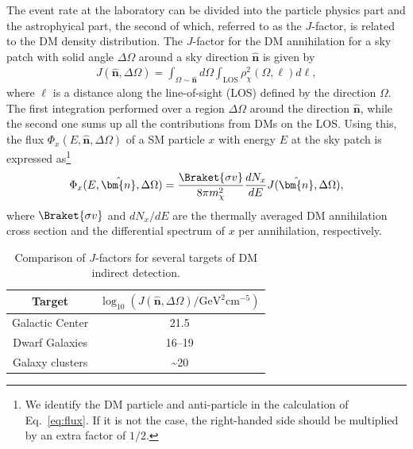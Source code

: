 \documentclass[12pt,twoside,book]{article}
\begin{document}
The event rate at the laboratory can be divided into the particle physics part and the astrophyical part, the second of which, referred to as the $J$-factor, is related to the DM density distribution.
The $J$-factor for the DM annihilation for a sky patch with solid angle $\Delta\Omega$ around a sky direction $\hat{\bm{n}}$ is given by
\begin{align}
  J(\hat{\bm{n}}, \Delta\Omega) = \int_{\Omega \sim \hat{\bm{n}}} d\Omega
  \int_{\mathrm{LOS}} \rho_\chi^2 (\Omega, \ell) d\ell,
  \label{eq:J-factor}
\end{align}
where $\ell$ is a distance along the line-of-sight (LOS) defined by the direction $\Omega$.
The first integration performed over a region $\Delta\Omega$ around the direction $\hat{\bm{n}}$, while the second one sums up all the contributions from DMs on the LOS.
Using this, the flux $\Phi_x(E, \hat{\bm{n}}, \Delta\Omega)$ of a SM particle $x$ with energy $E$ at the sky patch is expressed as\footnote{
  We identify the DM particle and anti-particle in the calculation of Eq.~\eqref{eq:flux}.
  If it is not the case, the right-handed side should be multiplied by an extra factor of $1/2$.
}
\begin{align}
  \Phi_x (E, \hat{\bm{n}}, \Delta\Omega) = \frac{\Braket{\sigma v}}{8\pi m_\chi^2}
  \frac{d N_x}{d E} J(\hat{\bm{n}}, \Delta\Omega),
  \label{eq:flux}
\end{align}
where $\Braket{\sigma v}$ and $d N_x / d E$ are the thermally averaged DM annihilation cross section and the differential spectrum of $x$ per annihilation, respectively.

\begin{table}[t]
  \centering
  \begin{tabular}{c|c}
    Target & $\log_{10} (J(\hat{\bm{n}}, \Delta\Omega) / \mathrm{GeV}^2 \mathrm{cm}^{-5})$ \\ \hline
    Galactic Center & 21.5\\
    Dwarf Galaxies & 16--19\\
    Galaxy clusters & \sim 20
  \end{tabular}
  \caption{Comparison of $J$-factors for several targets of DM indirect detection.}
  \label{tab:J-factors}
\end{table}
\end{document}
